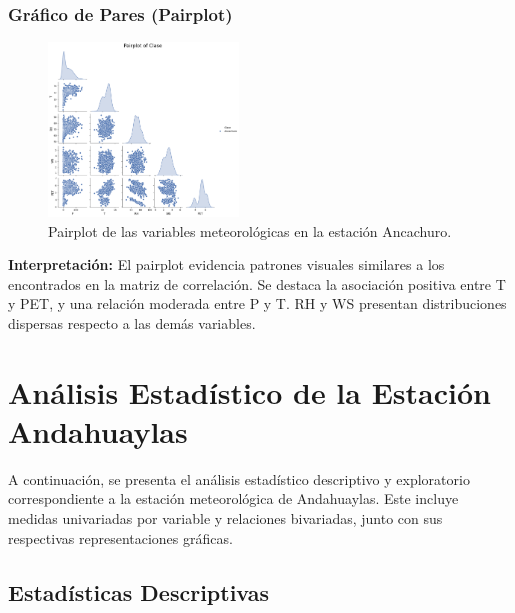 \subsubsection*{Gráfico de Pares (Pairplot)}
\begin{figure}[H]
\centering
\includegraphics[width=0.45\textwidth]{resultados/por_estacion_meteorologica/Ancachuro/pairplot.png}
\caption{Pairplot de las variables meteorológicas en la estación Ancachuro.}
\label{fig:ancachuro_pairplot}
\end{figure}
\textbf{Interpretación:} El pairplot evidencia patrones visuales similares a los encontrados en la matriz de correlación. Se destaca la asociación positiva entre T y PET, y una relación moderada entre P y T. RH y WS presentan distribuciones dispersas respecto a las demás variables.







\section{Análisis Estadístico de la Estación Andahuaylas}

A continuación, se presenta el análisis estadístico descriptivo y exploratorio correspondiente a la estación meteorológica de Andahuaylas. Este incluye medidas univariadas por variable y relaciones bivariadas, junto con sus respectivas representaciones gráficas.

\subsection{Estadísticas Descriptivas}

